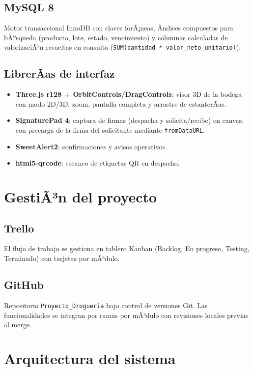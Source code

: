 ﻿\documentclass[a4paper, 12pt]{article}
\begin{document}
\subsection{MySQL 8}
Motor transaccional InnoDB con claves forÃ¡neas, Ã­ndices compuestos para bÃºsqueda (producto, lote, estado, vencimiento) y columnas calculadas de valorizaciÃ³n resueltas en consulta (\texttt{SUM(cantidad * valor\_neto\_unitario)}).

\subsection{LibrerÃ­as de interfaz}
\begin{itemize}
    \item \textbf{Three.js r128 + OrbitControls/DragControls}: visor 3D de la bodega con modo 2D/3D, zoom, pantalla completa y arrastre de estanterÃ­as.
    \item \textbf{SignaturePad 4}: captura de firmas (despacha y solicita/recibe) en canvas, con precarga de la firma del solicitante mediante \texttt{fromDataURL}.
    \item \textbf{SweetAlert2}: confirmaciones y avisos operativos.
    \item \textbf{html5-qrcode}: escaneo de etiquetas QR en despacho.
\end{itemize}

\section{GestiÃ³n del proyecto}

\subsection{Trello}
El flujo de trabajo se gestiona en tablero Kanban (Backlog, En progreso, Testing, Terminado) con tarjetas por mÃ³dulo.

\subsection{GitHub}
Repositorio \texttt{Proyecto\_Drogueria} bajo control de versiones Git. Las funcionalidades se integran por ramas por mÃ³dulo con revisiones locales previas al merge.

\section{Arquitectura del sistema}
\end{document}
